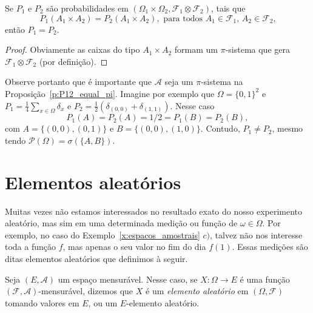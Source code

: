 \documentclass[../main/Notas_de_aula.tex]{subfiles}
\begin{document}
\begin{corollary}
  \label{c:produto_e_unico}
  Se $P_1$ e $P_2$ são probabilidades em $(\Omega_1 \times \Omega_2, \mathcal{F}_1 \otimes \mathcal{F}_2)$, tais que
  \begin{equation}
    P_1(A_1 \times A_2) = P_2(A_1 \times A_2), \text{ para todos $A_1 \in \mathcal{F}_1$, $A_2 \in \mathcal{F}_2$,}
  \end{equation}
  então $P_1 = P_2$.
\end{corollary}

\begin{proof}
  Obviamente as caixas do tipo $A_1 \times A_2$ formam um $\pi$-sistema que gera $\mathcal{F}_1 \otimes \mathcal{F}_2$ (por definição).
\end{proof}

\begin{example}
  Observe portanto que é importante que $\mathcal{A}$ seja um $\pi$-sistema na Proposição~\ref{p:P12_equal_pi}.
  Imagine por exemplo que $\Omega = \{0,1\}^2$ e $P_1 = \tfrac 14 \sum_{x \in \Omega} \delta_x$ e $P_2 = \tfrac 12 (\delta_{(0,0)} + \delta_{(1,1)})$.
  Nesse caso
  \begin{equation}
    P_1(A) = P_2(A) = 1/2 = P_1(B) = P_2(B),
  \end{equation}
  com $A = \{(0,0), (0,1)\}$ e $B = \{(0,0), (1,0)\}$.
  Contudo, $P_1 \neq P_2$, mesmo tendo $\mathcal{P}(\Omega) = \sigma(\{A,B\})$.
\end{example}


\section{Elementos aleatórios}

Muitas vezes não estamos interessados no resultado exato do nosso experimento aleatório, mas sim em uma determinada medição ou função de $\omega \in \Omega$.
Por exemplo, no caso do Exemplo~\ref{x:espacos_amostrais} $c)$, talvez não nos interesse toda a função $f$, mas apenas o seu valor no fim do dia $f(1)$.
Essas medições são ditas elementos aleatórios que definimos à seguir.

Seja $(E,\mathcal{A})$ um espaço mensurável.
Nesse caso, se $X: \Omega \to E$ é uma função $(\mathcal{F}, \mathcal{A})$-mensurável, dizemos que $X$ é um \emph{elemento aleatório}  em $(\Omega, \mathcal{F})$ tomando valores em $E$, ou um $E$-elemento aleatório.
\end{document}
